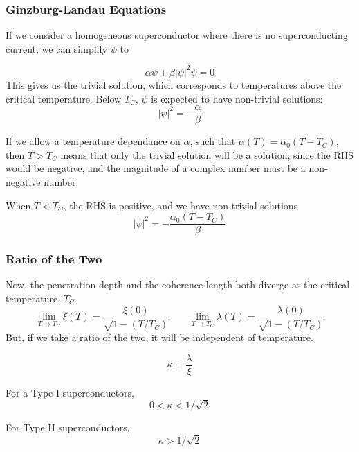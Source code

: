 \documentclass[10pt]{beamer}
\theoremstyle{definition}
\begin{document}
\begin{frame}[<+->]
    \frametitle{Ginzburg-Landau Equations}

    If we consider a homogeneous superconductor where there is no
    superconducting current, we can simplify $\psi$ to

    \begin{equation}
        \alpha\psi+\beta|\psi|^2\psi=0
    \end{equation}
    This gives us the trivial solution, which corresponds to temperatures above
    the critical temperature. Below $T_C$, $\psi$ is expected to have
    non-trivial solutions:
    \begin{equation}
        |\psi|^2=-\frac{\alpha}{\beta}
    \end{equation}

    If we allow a temperature dependance on $\alpha$, such that
    $\alpha(T)=\alpha_0(T-T_C)$, then $T>T_C$ means that only the trivial
    solution will be a solution, since the RHS would be negative, and 
    the magnitude of a complex number must be a non-negative number.

    When $T<T_C$, the RHS is positive, and we have non-trivial solutions
    \begin{equation}
        |\psi|^2=-\frac{\alpha_0(T-T_C)}{\beta}
    \end{equation}




\end{frame}

\begin{frame}
    \frametitle{Ratio of the Two}

    Now, the penetration depth and the coherence length both diverge as the
    critical temperature, $T_C$.
    \begin{equation}
        \lim_{T\rightarrow T_C} \xi(T) = \frac{\xi(0)}{\sqrt{1-(T/T_C)}} \qquad
        \lim_{T\rightarrow T_C} \lambda(T) = \frac{\lambda(0)}{\sqrt{1-(T/T_C)}}
    \end{equation}
    But, if we take a ratio of the two, it will be independent of temperature.

    \begin{equation}
        \kappa \equiv \frac{\lambda}{\xi}
    \end{equation}

    For a Type I superconductors,
    \begin{equation}
       0 < \kappa < 1/\sqrt{2}
    \end{equation}

    For Type II superconductors,
    \begin{equation}
        \kappa > 1/\sqrt{2}
    \end{equation}


\end{frame}
\end{document}
